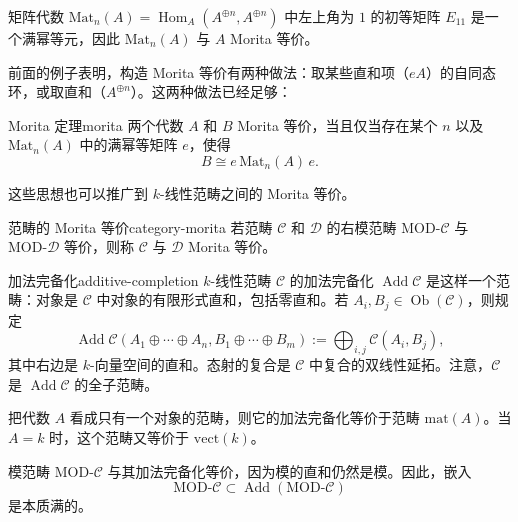 \begin{example}\label{ex:matrix-morita}
矩阵代数 $\mathrm{Mat}_n(A)=\operatorname{Hom}_A(A^{\oplus n},A^{\oplus n})$ 中左上角为 $1$ 的初等矩阵 $E_{11}$ 是一个满幂等元，因此 $\mathrm{Mat}_n(A)$ 与 $A$ Morita 等价。
\end{example}

前面的例子表明，构造 Morita 等价有两种做法：取某些直和项（$eA$）的自同态环，或取直和（$A^{\oplus n}$）。这两种做法已经足够：

\begin{theorem}{Morita 定理}{morita}
两个代数 $A$ 和 $B$ Morita 等价，当且仅当存在某个 $n$ 以及 $\mathrm{Mat}_n(A)$ 中的满幂等矩阵 $e$，使得
\[
  B\cong e\,\mathrm{Mat}_n(A)\,e.
\]
\end{theorem}

这些思想也可以推广到 $k$-线性范畴之间的 Morita 等价。

\begin{definition}{范畴的 Morita 等价}{category-morita}
若范畴 $\mathcal C$ 和 $\mathcal D$ 的右模范畴 $\mathrm{MOD}\text{-}\mathcal C$ 与 $\mathrm{MOD}\text{-}\mathcal D$ 等价，则称 $\mathcal C$ 与 $\mathcal D$ Morita 等价。
\end{definition}

\begin{definition}{加法完备化}{additive-completion}
$k$-线性范畴 $\mathcal C$ 的加法完备化 $\operatorname{Add}\mathcal C$ 是这样一个范畴：对象是 $\mathcal C$ 中对象的有限形式直和，包括零直和。若 $A_i,B_j\in\operatorname{Ob}(\mathcal C)$，则规定
\[
\operatorname{Add}\mathcal C
 (A_1\oplus\cdots\oplus A_n,B_1\oplus\cdots\oplus B_m)
 :=\bigoplus_{i,j}\mathcal C(A_i,B_j),
\]
其中右边是 $k$-向量空间的直和。态射的复合是 $\mathcal C$ 中复合的双线性延拓。注意，$\mathcal C$ 是 $\operatorname{Add}\mathcal C$ 的全子范畴。
\end{definition}

\begin{example}[加法完备化]\label{ex:additive-completion}
把代数 $A$ 看成只有一个对象的范畴，则它的加法完备化等价于范畴 $\mathrm{mat}(A)$。当 $A=k$ 时，这个范畴又等价于 $\mathrm{vect}(k)$。
\end{example}

\begin{example}[模范畴的加法完备化]\label{ex:module-additive-completion}
模范畴 $\mathrm{MOD}\text{-}\mathcal C$ 与其加法完备化等价，因为模的直和仍然是模。因此，嵌入
\[
  \mathrm{MOD}\text{-}\mathcal C\subset\operatorname{Add}(\mathrm{MOD}\text{-}\mathcal C)
\]
是本质满的。
\end{example}

